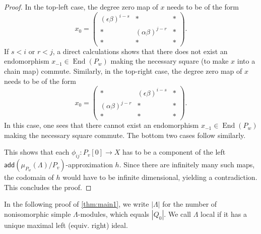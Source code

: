 \documentclass[11pt]{amsart}
\newcommand{\add}{\mathsf{add}}
\DeclareMathOperator{\End}{\mathrm{End}}
\theoremstyle{definition}
\begin{document}
\begin{proof}
	In the top-left case, the degree zero map of $x$ needs to be of the form 
	\[ x_0 = \begin{pmatrix} (\epsilon \beta)^{i-s} & * & * \\ * & (\alpha \beta)^{j-r} & * \\ * & * &*\end{pmatrix}. \]
	If $s<i$ or $r <j$, a direct calculations shows that there does not exist an endomorphism $x_{-1} \in \End(P_w)$ making the necessary square (to make $x$ into a chain map) commute. Similarly, in the top-right case, the degree zero map of $x$ needs to be of the form 
	\[ x_0 = \begin{pmatrix} * & (\epsilon \beta)^{i-s} & * \\ (\alpha \beta)^{j-r} &* & * \\ * & * &*\end{pmatrix}. \]
	In this case, one sees that there cannot exist an endomorphism $x_{-1} \in \End(P_w)$ making the necessary square commute. The bottom two cases follow similarly. 
	
	This shows that each $\phi_{ij}: P_v[0] \to X$ has to be a component of the left $\add(\mu_{P_w}(\Lambda)/P_v)$-approximation $h$. Since there are infinitely many such maps, the codomain of $h$ would have to be infinite dimensional, yielding a contradiction. This concludes the proof. 
	\end{proof}

In the following proof of \cref{thm:main1}, we write $|\Lambda|$ for the number of nonisomorphic simple $\Lambda$-modules, which equals $|Q_0|$. We call $\Lambda$ local if it has a unique maximal left (equiv. right) ideal. 
\end{document}
